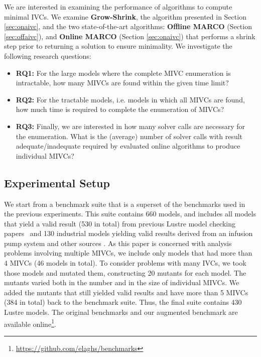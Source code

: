 We are interested in examining the performance of algorithms to compute minimal IVCs.
We examine \textbf{Grow-Shrink}, the algorithm presented in Section \ref{sec:onaivc}, and the two state-of-the-art algorithms: \textbf{Offline MARCO} (\aivcalg Section \ref{sec:offaivc}), and \textbf{Online MARCO} (Section \ref{sec:onaivc}) that performs a shrink step prior to returning a solution to ensure minimality.
We investigate the following research questions: 
\begin{itemize}
  \item \textbf{RQ1:} For the large models where the complete MIVC enumeration is intractable,
how many MIVCs are found within the given time limit? 
  \item \textbf{RQ2:} For the tractable models, i.e. models in which all MIVCs are found, how much time is required to complete the enumeration of MIVCs?
  \item \textbf{RQ3:} Finally, we are interested in how many solver calls are necessary for the enumeration. What is the (average) number of solver calls with result adequate/inadequate required by evaluated online algorithms to produce individual MIVCs?
\end{itemize}

\subsection{Experimental Setup}
  We start from a benchmark suite that is a superset of the benchmarks used in the previous experiments. This suite contains 660 models, and includes all models that yield a valid result (530 in total) from previous Lustre model checking papers~\cite{Hagen08:FMCAD,piskac2016} and 130 industrial models yielding valid results derived from an infusion pump system \cite{hilt2013} and other sources \cite{piskac2016,NFM2015:backes}.
As this paper is concerned with analysis problems involving multiple MIVCs, we include only models that had more than 4 MIVCs (46 models in total).  To consider problems with many IVCs, we took those models and mutated them, constructing 20 mutants for each model. The mutants varied both in the number and in the size of individual MIVCs.
We added the mutants that still yielded valid results and have more than 5 MIVCs (384 in total) back to the benchmark suite.
Thus, the final suite contains 430 Lustre models. The original benchmarks and our augmented benchmark are available online\footnote{\url{https://github.com/elaghs/benchmarks}}.

